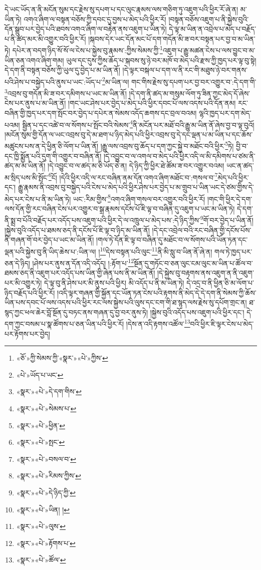 དེ་ཡང་ཡོད་ན་ནི་མངོན་སུམ་དང་རྗེས་སུ་དཔག་པ་དང་ལུང་རྣམས་ལས་གཅིག་ཏུ་འཇུག་པའི་ཕྱིར་རོ་ཞེ་ན། མ་ཡིན་ཏེ། འགའ་ཞིག་ལ་བསྟན་བཅོས་ཀྱི་དབང་དུ་བྱས་པ་མེད་པའི་ཕྱིར་རོ། །བསྟན་བཅོས་འཇུག་པ་ནི་སྐྱེས་བུའི་དོན་སྒྲུབ་པར་བྱེད་པའི་ཐབས་འགའ་ཞིག་ལ་བརྟེན་ནས་འཇུག་པ་ཡིན་ཏེ། དེ་ལྟ་མ་ཡིན་ན་འབྲེལ་པ་མེད་པ་བརྗོད་པ་ནི་ཚད་མར་མི་འགྱུར་བའི་ཕྱིར་རོ། །སྐབས་དེར་ཡང་དོན་མང་པོ་དག་གདོན་མི་ཟ་བར་བསྟན་པར་བྱ་བ་མ་ཡིན་ཏེ། དཔེར་ན་བདག་ཉིད་སོ་སོ་ལ་ངེས་པ་སྐྱེས་བུ་རྣམས་:ཀྱིས་སེམས་ཀྱི་\footnote{«ཅོ་»ཀྱི་སེམས་ཀྱི་«སྣར་»«པེ་»ཀྱིས་}འཇུག་པ་རྒྱུ་མཚན་ངེས་པ་ལས་བྱུང་བ་མ་ཡིན་ཅན་འགའ་ཞིག་གམ། ཡུལ་དང་དུས་ཀྱིས་ཆོད་པ་སྐབས་སུ་ཉེ་བར་མཁོ་བ་མེད་པའི་རྫས་ཀྱི་ཁྱད་པར་ལྟ་བུ་སྟེ། དེ་དག་ནི་བསྟན་བཅོས་ཀྱི་ཡུལ་དུ་བྱེད་པ་མ་ཡིན་ནོ། །དེ་ལྟར་བསྐལ་པ་དག་ལ་ནི་རང་གི་མཐུས་ཉེ་བར་གནས་པའི་ཤེས་པ་བསྐྱེད་པའི་ནུས་པ་ཡང་:ཡོད་པ་\footnote{«པེ་»ཡོད་པ་ཡང་}མ་ཡིན་ལ། གང་གིས་རྗེས་སུ་དཔག་པར་བྱ་བར་འགྱུར་བ་:དེ་དག་གི་\footnote{«སྣར་»«པེ་»དེ་དག་གིས་}འབྲས་བུ་གདོན་མི་ཟ་བར་དམིགས་པ་ཡང་མ་ཡིན་ནོ། །དེ་དག་ནི་ཚད་མ་གསུམ་ལོག་ཏུ་ཟིན་ཀྱང་མེད་དོ་ཞེས་ངེས་པར་ནུས་པ་མ་ཡིན་ནོ། །གང་ཡང་ཤེས་པར་བྱེད་པ་མེད་པའི་ཕྱིར་དབང་པོ་ལས་འདས་པའི་དོན་ནམ། རང་བཞིན་གྱི་ཁྱད་པར་དག་སྤོང་བར་བྱེད་པ་དཔེར་ན་སེམས་འདོད་ཆགས་དང་བྲལ་བའམ། ལྷའི་ཁྱད་པར་དག་མེད་པའམ། སྦྱིན་པ་དང་འཚེ་བ་ལ་སོགས་པ་སྤོང་བའི་སེམས་\footnote{«སྣར་»«པེ་»སེམས་པ་}ནི་མངོན་པར་མཐོ་བའི་རྒྱུ་མ་ཡིན་ནོ་ཞེས་བྱ་བ་ལྟ་བུའོ། །མངོན་སུམ་གྱི་དོན་ལ་ཡང་འབྲས་བུ་དེ་མ་ཐག་པ་ཉིད་མེད་པའི་ཕྱིར་འབྲས་བུ་དེ་དང་ལྡན་པ་མ་ཡིན་པ་དང་ཆོས་མཚུངས་པས་ན་དེ་ཕྱིན་ཅི་ལོག་པ་ཡིན་ནོ། །རྒྱུ་ལས་འབྲས་བུ་ཆོད་པ་དག་ཀྱང་སྐྱེ་བ་མཐོང་བའི་ཕྱིར་\footnote{«སྣར་»«པེ་»ཕྱིན་}ཏེ། བྱི་བ་དང་ཁྱི་སྨྱོན་པའི་དུག་གི་འགྱུར་བ་བཞིན་ནོ། །དེ་འབྱུང་བ་ལ་འགལ་བ་མེད་པའི་ཕྱིར་འདི་ལ་མི་དམིགས་པ་ཙམ་ནི་ཚད་མ་མ་ཡིན་ནོ། །དེ་འབྱུང་བ་ལ་ཚད་མ་ཅི་ཡོད་ཅེ་ན། དེ་ཉིད་ཀྱི་ཕྱིར་ཐེ་ཚོམ་ཟ་བར་འགྱུར་བའམ། ཡང་ན་ཚད་མ་སྲིད་པས་མི་སྤོང་\footnote{«སྣར་»«པེ་»སྤང་}ངོ། །དེའི་ཕྱིར་འདི་ལ་རང་བཞིན་ནམ་དོན་འགའ་ཞིག་མཐོང་བ་:གསལ་བ་\footnote{«སྣར་»«པེ་»བསལ་བ་}མེད་པའི་ཕྱིར་དང་། རྒྱུ་རྣམས་ནི་འབྲས་བུ་བསྐྱེད་པའི་ངེས་པ་མེད་པའི་ཕྱིར་ཤེས་པར་བྱེད་པ་མ་གྲུབ་པ་ཡིན་ཡང་དེ་ཙམ་གྱིས་དེ་མེད་པར་ངེས་པ་ནི་མ་ཡིན་ཏེ། ཡང་:རིམ་གྱིས་\footnote{«སྣར་»«པེ་»རིམས་ཀྱིས་}འགའ་ཞིག་གསལ་བར་འགྱུར་བའི་ཕྱིར་རོ། །གང་གི་ཕྱིར་དེ་དག་ལས་དོན་གྱི་རང་བཞིན་ངེས་པར་འགྱུར་བ་སྒྲ་རྣམས་དངོས་པོ་ཇི་ལྟ་བ་བཞིན་དུ་འཇུག་པ་ཡང་མ་ཡིན་ཏེ། དེ་དག་ནི་སྨྲ་བ་པོའི་བརྗོད་པར་འདོད་པས་འཇུག་པའི་ཕྱིར་དེ་ལ་འཁྲུལ་པ་མེད་པས་:དེ་ཉིད་ཀྱིས་\footnote{«སྣར་»«པེ་»དེ་ཉིད་ཀྱི་}གོ་བར་བྱེད་པ་ཡིན་ནོ། །སྐྱེས་བུའི་འདོད་པ་ཐམས་ཅད་ནི་དངོས་པོ་ཇི་ལྟ་བ་ཉིད་མ་ཡིན་ནོ། །དེ་དང་འབྲེལ་བའི་རང་བཞིན་གྱི་དངོས་པོས་ནི་གཞན་གོ་བར་བྱེད་པ་ཡང་མ་ཡིན་ནོ། །གལ་ཏེ་དོན་ཇི་ལྟ་བ་བཞིན་དུ་མཐོང་བ་ལ་སོགས་པའི་ཡོན་ཏན་དང་ལྡན་པའི་སྐྱེས་བུ་ནི་ཡིད་ཆེས་པ་:ཡིན་ལ། །\footnote{«སྣར་»«པེ་»ཡིན། །}དེས་བསྟན་པའི་ལུང་\footnote{«སྣར་»«པེ་»ལུས་}ནི་མི་སླུ་བ་ཡིན་ནོ་ཞེ་ན། གལ་ཏེ་ཁྱད་པར་ཅན་དེ་ཉིད། །ཤེས་པར་ནུས་ན་དོན་འདི་འདོད། །:རྟོག་པ་\footnote{«སྣར་»«པེ་»རྟོགས་པ་}སྔོན་དུ་གཏོང་བ་ཅན་ལུང་ངམ་ལུང་མ་ཡིན་པ་ཚོལ་བ་ཐམས་ཅད་ནི་འཇུག་པར་འདོད་པས་ཡིན་གྱི་ཞེན་པས་ནི་མ་ཡིན་ནོ། །དེ་སྐྱེས་བུ་བརྟགས་ནས་འཇུག་ན་ནི་འཇུག་པར་མི་འགྱུར་ཏེ། དེ་ལྟ་བུ་ནི་ཤེས་པར་མི་ནུས་པའི་ཕྱིར། མི་འདོད་པ་ནི་མ་ཡིན་ཏེ། དེ་འདྲ་བ་ནི་ཕྱིན་ཅི་མ་ལོག་པ་ཉིད་བརྗོད་པའི་ཕྱིར་རོ། །འདི་ལྟར་གཞན་གྱི་སྐྱོན་དང་ཡོན་ཏན་ངེས་པའི་རྟགས་ནི་མེད་དེ་དེ་དག་ནི་སེམས་ཀྱི་ཆོས་ཡིན་པས་དབང་པོ་ལས་འདས་པའི་ཕྱིར་རང་ལས་སྐྱེས་པའི་ལུས་དང་ངག་གི་ཐ་སྙད་ལས་རྗེས་སུ་དཔོག་གྲང་ན། ཐ་སྙད་ཀྱང་ཕལ་ཆེར་བློ་སྔོན་དུ་བཏང་ནས་གཞན་དུ་བྱ་བར་ནུས་ཏེ། །སྐྱེས་བུའི་འདོད་པས་འཇུག་པའི་ཕྱིར་དང་། དེ་དག་ཀྱང་བསམ་པ་སྣ་ཚོགས་པ་ཅན་ཡིན་པའི་ཕྱིར་རོ། །དེས་ན་འདི་རྟགས་འཚོལ་\footnote{«སྣར་»«པེ་»ཚོལ་}བའི་ཕྱིར་ཇི་ལྟར་ངེས་པ་མེད་པར་རྟོགས་པར་བྱེད། 